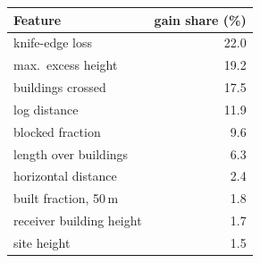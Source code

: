 \begin{tabular}{lr}
\toprule
Feature & gain share (\%) \\
\midrule
knife-edge loss & 22.0 \\
max.\ excess height & 19.2 \\
buildings crossed & 17.5 \\
log distance & 11.9 \\
blocked fraction & 9.6 \\
length over buildings & 6.3 \\
horizontal distance & 2.4 \\
built fraction, 50\,m & 1.8 \\
receiver building height & 1.7 \\
site height & 1.5 \\
\bottomrule
\end{tabular}
